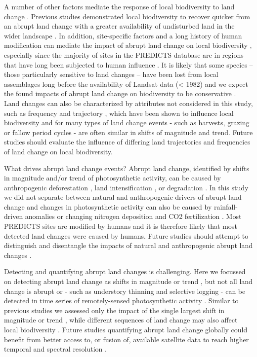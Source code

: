A number of other factors mediate the response of local biodiversity to land change \citep{Arroyo-Rodriguez2015}.  Previous studies demonstrated local biodiversity to recover quicker from an abrupt land change with a greater availability of undisturbed land in the wider landscape \citep{Turner1989,Chase2003,Shackelford2017}. In addition, site-specific factors and a long history of human modification can mediate the impact of abrupt land change on local biodiversity \citep{Ellis2015a,Jung2016}, especially since the majority of sites in the PREDICTS database are in regions that have long been subjected to human influence \citep{Newbold2016,Hudson2016}. It is likely that some species – those particularly sensitive to land changes – have been lost from local assemblages long before the availability of Landsat data (< 1982) and we expect the found impacts of abrupt land change on biodiversity to be conservative \citep{Mihoub2017}. Land changes can also be characterized by attributes not considered in this study, such as frequency and trajectory \citep{Watson2014}, which have been shown to influence local biodiversity \citep{Tiemann2015,Wood2017} and for many types of land change events - such as harvests, grazing or fallow period cycles \citep{Kleyer2007,Ray2013} - are often similar in shifts of magnitude and trend. Future studies should evaluate the influence of differing land trajectories and frequencies of land change on local biodiversity.

What drives abrupt land change events? Abrupt land change, identified by shifts in magnitude and/or trend of photosynthetic activity, can be caused by anthropogenic deforestation \citep{DeVries2015b}, land intensification \citep{Fensholt2012,Muller2014}, or degradation \citep{Tian2015,Aguiar2017}. In this study we did not separate between natural and anthropogenic drivers of abrupt land change and changes in photosynthetic activity can also be caused by rainfall-driven anomalies \citep{Papagiannopoulou2017} or changing nitrogen deposition and CO2 fertilization \citep{Zhu2016}. Most PREDICTS sites are modified by humans \citep{Newbold2016,Hudson2016} and it is therefore likely that most detected land changes were caused by humans. Future studies should attempt to distinguish and disentangle the impacts of natural and anthropogenic abrupt land changes \citep{Curtis2018}. 

Detecting and quantifying abrupt land changes is challenging. Here we focussed on detecting abrupt land change as shifts in magnitude or trend \citep{Verbesselt2010a}, but not all land change is abrupt \citep{Vogelmann2012a} or - such as understory thinning and selective logging - can be detected in time series of remotely-sensed photosynthetic activity \citep{Asner2005,Peres2006}. Similar to previous studies we assessed only the impact of the single largest shift in magnitude or trend \citep{DeJong2013,Song2018}, while different sequences of land change may also affect local biodiversity \citep{Watson2014}. Future studies quantifying abrupt land change globally could benefit from better access to, or fusion of, available satellite data to reach higher temporal and spectral resolution \citep{Reiche2015,Wulder2015}.

